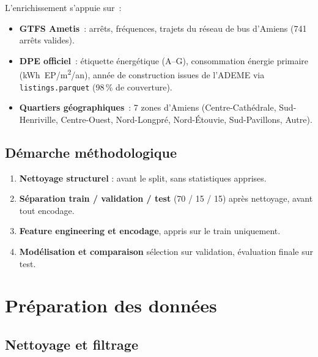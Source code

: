 \documentclass[12pt,a4paper]{article}
\begin{document}
L'enrichissement s'appuie sur~:
\begin{itemize}
    \item \textbf{GTFS Ametis}~: arr\^ets, fr\'equences, trajets du r\'eseau de bus d'Amiens (741 arr\^ets valides).
    \item \textbf{DPE officiel}~: \'etiquette \'energ\'etique (A--G), consommation \'energie primaire (kWh~EP/m\textsuperscript{2}/an), ann\'ee de construction issues de l'ADEME via \texttt{listings.parquet} (98\,\% de couverture).
    \item \textbf{Quartiers g\'eographiques}~: 7 zones d'Amiens (Centre-Cath\'edrale, Sud-Henriville, Centre-Ouest, Nord-Longpr\'e, Nord-\'Etouvie, Sud-Pavillons, Autre).
\end{itemize}

\subsection{D\'emarche m\'ethodologique}

\begin{enumerate}
    \item \textbf{Nettoyage structurel} : avant le split, sans statistiques apprises.
    \item \textbf{S\'eparation train / validation / test} (70 / 15 / 15) apr\`es nettoyage, avant tout encodage.
    \item \textbf{Feature engineering et encodage}, appris sur le train uniquement.
    \item \textbf{Mod\'elisation et comparaison}  s\'election sur validation, \'evaluation finale sur test.
\end{enumerate}

\newpage
\section{Pr\'eparation des donn\'ees}
\label{sec:preparation}

\subsection{Nettoyage et filtrage}
\end{document}

